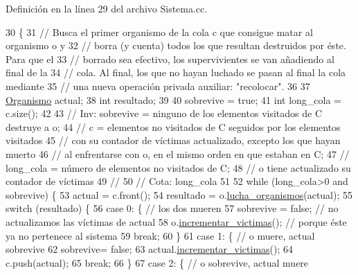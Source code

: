Definición en la línea 29 del archivo Sistema.\+cc.


\begin{DoxyCode}
30 \{
31 \textcolor{comment}{// Busca el primer organismo de la cola c que consigue matar al organismo o y}
32 \textcolor{comment}{// borra (y cuenta) todos los que resultan destruidos por éste. Para que el}
33 \textcolor{comment}{// borrado sea efectivo, los supervivientes se van añadiendo al final de la }
34 \textcolor{comment}{// cola. Al final, los que no hayan luchado se pasan al final la cola mediante}
35 \textcolor{comment}{// una nueva operación privada auxiliar: "recolocar".}
36 
37    \hyperlink{class_organismo}{Organismo} actual; 
38    \textcolor{keywordtype}{int} resultado; 
39  
40    sobrevive = \textcolor{keyword}{true};
41    \textcolor{keywordtype}{int} long\_cola = c.size();
42   
43 \textcolor{comment}{// Inv: sobrevive = ninguno de los elementos visitados de C destruye a o;}
44 \textcolor{comment}{//      c = elementos no visitados de C seguidos por los elementos visitados}
45 \textcolor{comment}{//      con su contador de víctimas actualizado, excepto los que hayan muerto }
46 \textcolor{comment}{//      al enfrentarse con o, en el mismo orden en que estaban en C;}
47 \textcolor{comment}{//      long\_cola = número de elementos no visitados de C;}
48 \textcolor{comment}{//      o tiene actualizado su contador de víctimas}
49 \textcolor{comment}{// }
50 \textcolor{comment}{// Cota: long\_cola}
51 
52    \textcolor{keywordflow}{while} (long\_cola>0 and sobrevive) \{
53       actual = c.front();
54       resultado = o.\hyperlink{class_organismo_a2f4573f69288fa8ec05ec709f2336a8d}{lucha\_organismos}(actual);
55       \textcolor{keywordflow}{switch} (resultado) \{
56          \textcolor{keywordflow}{case} 0: \{                    \textcolor{comment}{// los dos mueren}
57             sobrevive = \textcolor{keyword}{false};        \textcolor{comment}{// no actualizamos las víctimas de actual }
58             o.\hyperlink{class_organismo_ae498385e40b42c4e9b11226befd6e4c6}{incrementar\_victimas}(); \textcolor{comment}{// porque éste ya no pertenece al sistema}
59             \textcolor{keywordflow}{break};
60          \} 
61          \textcolor{keywordflow}{case} 1: \{                    \textcolor{comment}{// o muere, actual sobrevive}
62             sobrevive= \textcolor{keyword}{false};
63             actual.\hyperlink{class_organismo_ae498385e40b42c4e9b11226befd6e4c6}{incrementar\_victimas}();
64             c.push(actual);
65             \textcolor{keywordflow}{break};
66          \}
67          \textcolor{keywordflow}{case} 2: \{                    \textcolor{comment}{// o sobrevive, actual muere}

\end{DoxyCode}
